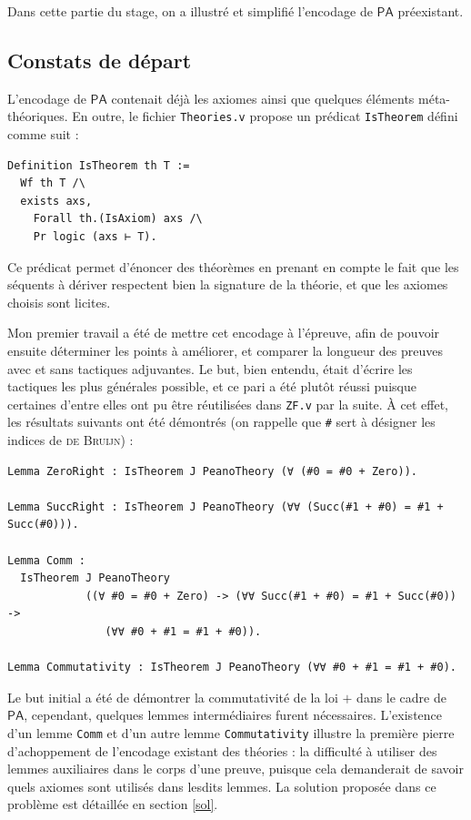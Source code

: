 \documentclass[a4paper]{article}
\newcommand{\PA}{\mathsf{PA}}
\theoremstyle{remark}
\theoremstyle{remark}
\theoremstyle{remark}
\theoremstyle{definition}
\theoremstyle{definition}
\theoremstyle{definition}
\begin{document}
Dans cette partie du stage, on a illustré et simplifié l'encodage de $\PA$ préexistant.

\subsection{Constats de départ}

L'encodage de $\PA$ contenait déjà les axiomes ainsi que quelques éléments méta-théoriques. En outre, le fichier \verb+Theories.v+ propose un prédicat \verb+IsTheorem+ défini comme suit :
\begin{verbatim}
Definition IsTheorem th T :=
  Wf th T /\
  exists axs,
    Forall th.(IsAxiom) axs /\
    Pr logic (axs ⊢ T).
\end{verbatim}
Ce prédicat permet d'énoncer des théorèmes en prenant en compte le fait que les séquents à dériver respectent bien la signature de la théorie, et que les axiomes choisis sont licites.

Mon premier travail a été de mettre cet encodage à l'épreuve, afin de pouvoir ensuite déterminer les points à améliorer, et comparer la longueur des preuves avec et sans tactiques adjuvantes. Le but, bien entendu, était d'écrire les tactiques les plus générales possible, et ce pari a été plutôt réussi puisque certaines d'entre elles ont pu être réutilisées dans \verb+ZF.v+ par la suite. \`A cet effet, les résultats suivants ont été démontrés (on rappelle que \verb+#+ sert à désigner les indices de \textsc{de Bruijn}) :
\begin{verbatim}
Lemma ZeroRight : IsTheorem J PeanoTheory (∀ (#0 = #0 + Zero)).

Lemma SuccRight : IsTheorem J PeanoTheory (∀∀ (Succ(#1 + #0) = #1 + Succ(#0))).

Lemma Comm :
  IsTheorem J PeanoTheory
            ((∀ #0 = #0 + Zero) -> (∀∀ Succ(#1 + #0) = #1 + Succ(#0)) ->
               (∀∀ #0 + #1 = #1 + #0)).

Lemma Commutativity : IsTheorem J PeanoTheory (∀∀ #0 + #1 = #1 + #0).
\end{verbatim}
Le but initial a été de démontrer la commutativité de la loi $+$ dans le cadre de $\PA$, cependant, quelques lemmes intermédiaires furent nécessaires. L'existence d'un lemme \verb+Comm+ et d'un autre lemme \verb+Commutativity+ illustre la première pierre d'achoppement de l'encodage existant des théories : la difficulté à utiliser des lemmes auxiliaires dans le corps d'une preuve, puisque cela demanderait de savoir quels axiomes sont utilisés dans lesdits lemmes. La solution proposée dans ce problème est détaillée en section \ref{sol}.
\end{document}
